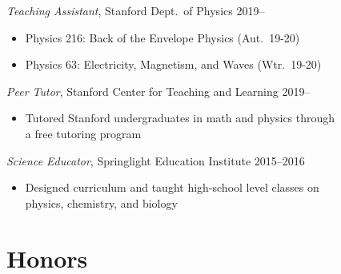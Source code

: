 \documentclass[margin,11pt]{res}
\newenvironment{myitemize}
{ \vspace{-1.5\topsep} \begin{itemize} \setlength\itemsep{0em}}
{ \end{itemize} \vspace{-1.0\topsep}}
\begin{document}
\begin{resume}
\textit{Teaching Assistant}, Stanford Dept.\ of Physics \hfill 2019--\\
\begin{myitemize}
    \item Physics 216: Back of the Envelope Physics (Aut.\ 19-20)
    \item Physics 63: Electricity, Magnetism, and Waves (Wtr.\ 19-20)
\end{myitemize}

\textit{Peer Tutor}, Stanford Center for Teaching and Learning \hfill 2019--\\
\begin{myitemize}
    \item Tutored Stanford undergraduates in math and physics through\\
        a free tutoring program
\end{myitemize}

\textit{Science Educator}, Springlight Education Institute \hfill 2015--2016\\
\begin{myitemize}
    \item Designed curriculum and taught high-school level classes on \\
        physics, chemistry, and biology
\end{myitemize}




\section{Honors}
 

\end{resume}
\end{document}
